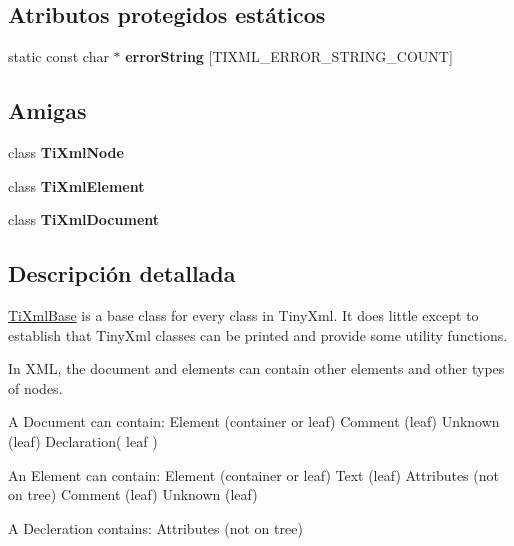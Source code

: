 \subsection*{\-Atributos protegidos estáticos}
\begin{DoxyCompactItemize}
\item 
static const char $\ast$ {\bfseries error\-String} \mbox{[}\-T\-I\-X\-M\-L\-\_\-\-E\-R\-R\-O\-R\-\_\-\-S\-T\-R\-I\-N\-G\-\_\-\-C\-O\-U\-N\-T\mbox{]}
\end{DoxyCompactItemize}
\subsection*{\-Amigas}
\begin{DoxyCompactItemize}
\item 
\hypertarget{classTiXmlBase_a218872a0d985ae30e78c55adc4bdb196}{class {\bfseries \-Ti\-Xml\-Node}}\label{classTiXmlBase_a218872a0d985ae30e78c55adc4bdb196}

\item 
\hypertarget{classTiXmlBase_ab6592e32cb9132be517cc12a70564c4b}{class {\bfseries \-Ti\-Xml\-Element}}\label{classTiXmlBase_ab6592e32cb9132be517cc12a70564c4b}

\item 
\hypertarget{classTiXmlBase_a173617f6dfe902cf484ce5552b950475}{class {\bfseries \-Ti\-Xml\-Document}}\label{classTiXmlBase_a173617f6dfe902cf484ce5552b950475}

\end{DoxyCompactItemize}


\subsection{\-Descripción detallada}
\hyperlink{classTiXmlBase}{\-Ti\-Xml\-Base} is a base class for every class in \-Tiny\-Xml. \-It does little except to establish that \-Tiny\-Xml classes can be printed and provide some utility functions.

\-In \-X\-M\-L, the document and elements can contain other elements and other types of nodes.

\begin{DoxyVerb}
	A Document can contain:	Element	(container or leaf)
							Comment (leaf)
							Unknown (leaf)
							Declaration( leaf )

	An Element can contain:	Element (container or leaf)
							Text	(leaf)
							Attributes (not on tree)
							Comment (leaf)
							Unknown (leaf)

	A Decleration contains: Attributes (not on tree)
	\end{DoxyVerb}
 

